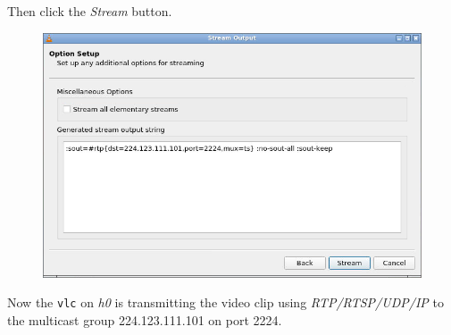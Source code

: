 \documentclass{../UTNetLab}
\begin{document}
Then click the \textit{Stream} button.
\begin{figure}[H]
    \centering
    \includegraphics[scale=1.8]{img/stream5}
\end{figure}
Now the \lstinline{vlc} on \textit{h0} is transmitting the video clip using \textit{RTP/RTSP/UDP/IP} to the multicast group {224.123.111.101} on port {2224}.
\end{document}
